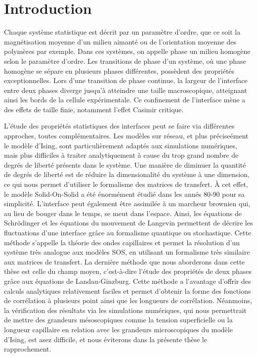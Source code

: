 \chapter*{Introduction}


Chaque système statistique est décrit par un paramètre d'ordre, que ce soit la magnétisation moyenne d'un milieu aimanté ou de l'orientation moyenne des polymères par exemple. Dans ces systèmes, on appelle phase un milieu homogène selon le paramètre d'ordre. Les transitions de phase d'un système, où une phase homogène se sépare en plusieurs phases différentes, possèdent des propriétés exceptionnelles. Lors d'une transition de phase continue, la largeur de l'interface entre deux phases diverge jusqu'à atteindre une taille macroscopique, atteignant ainsi les bords de la cellule expérimentale. Ce confinement de l'interface mène a des effets de taille finie, notamment l'effet Casimir critique.

L'étude des propriétés statistiques des interfaces peut se faire via différentes approches, toutes complémentaires. Les modèles sur réseau, et plus préciseément le modèle d'Ising, sont particulièrement adaptés aux simulations numériques, mais plus difficiles à traiter analytiquement à cause du trop grand nombre de degrés de liberté présents dans le système. Une manière de diminuer la quantité de degrés de liberté est de réduire la dimensionalité du système à une dimension, ce qui nous permet d'utiliser le formalisme des matrices de transfert. À cet effet, le modèle Solid-On-Solid a été énormément étudié dans les annés 80-90 pour sa simplicité.
L'interface peut également être assimilée à un marcheur brownien qui, au lieu de bouger dans le temps, se meut dans l'espace. Ainsi, les équations de Schrödinger et les équations du mouvement de Langevin permettent de décrire les fluctuations d'une interface grâce au formalisme quantique ou stochastique. Cette méthode s'appelle la théorie des ondes capillaires et permet la résolution d'un système très analogue aux modèles SOS, en utilisant un formalisme très similaire aux matrices de transfert. 
La dernière méthode que nous aborderons dans cette thèse est celle du champ moyen, c'est-à-dire l'étude des propriétés de deux phases grâce aux équations de Landau-Ginzburg. Cette méthode a l'avantage d'offrir des calculs analytiques relativement faciles et permet d'obtenir la forme des fonctions de corrélation à plusieurs point ainsi que les longueurs de corrélation. Néanmoins, la vérification des résultats via les simulations numériques, qui nous permettrait de mettre des grandeurs mésoscopiques comme la tension superficielle ou la longueur capillaire en relation avec les grandeurs microscopiques du modèle d'Ising, est asez difficile, et nous éviterons dans la présente thèse le rapprochement.

